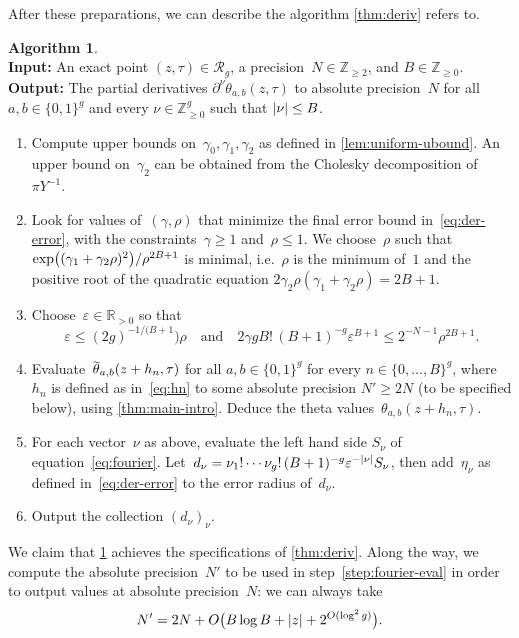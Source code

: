 \documentclass[12pt,oneside]{amsart}
\numberwithin{equation}{section}
\theoremstyle{definition}
\newtheorem{algorithm}[equation]{Algorithm}
\newcommand{\algoinput}[1]{~\\ \noindent\textbf{Input:} #1}
\newcommand{\algooutput}[1]{~\\ \noindent\textbf{Output:} #1}
\newcommand{\Z}{\mathbb{Z}}
\newcommand{\R}{\mathbb{R}}
\newcommand{\red}{\mathcal{R}}
\newcommand{\eps}{\varepsilon}
\DeclareMathOperator{\thetatilde}{\rlap{\raisebox{-0.1ex}{$\widetilde{\phantom{\,t}}$}}\theta}
\DeclarePairedDelimiter{\abs}{|}{|}
\DeclarePairedDelimiter{\paren}{(}{)}
\begin{document}
After these preparations, we can describe the algorithm \cref{thm:deriv} refers
to.

\begin{algorithm}
  \label{algo:deriv}
  \algoinput{An exact point $(z,\tau)\in \red_g$, a
    precision~$N\in \Z_{\geq 2}$, and $B\in \Z_{\geq 0}$.}  \algooutput{The
    partial derivatives $\partial^\nu\theta_{a,b}(z,\tau)$ to absolute
    precision~$N$ for all $a,b\in \{0,1\}^g$ and every $\nu\in \Z_{\geq 0}^g$
    such that $\abs{\nu}\leq B$.}
  \begin{enumerate}
  \item Compute upper bounds on~$\gamma_0,\gamma_1,\gamma_2$ as defined in
    \cref{lem:uniform-ubound}. An upper bound on~$\gamma_2$ can be obtained
    from the Cholesky decomposition of~$\pi Y^{-1}$.
  \item Look for values of~$(\gamma,\rho)$ that minimize the final error bound
    in~\eqref{eq:der-error}, with the constraints~$\gamma\geq 1$
    and~$\rho\leq 1$. We choose~$\rho$ such that
    $\exp\paren[\big]{(\gamma_1 + \gamma_2\rho)^2}/\rho^{2B+1}$ is minimal,
    i.e.~$\rho$ is the minimum of~$1$ and the positive root of the quadratic
    equation $2\gamma_2\rho(\gamma_1 + \gamma_2\rho) = 2B+1$.
  \item \label{step:eps} Choose~$\eps\in \R_{>0}$ so that
    \begin{displaymath}
      \eps\leq (2g)^{-1/(B+1})\rho\quad\text{and}\quad 2\gamma g B!\, (B+1)^{-g} \eps^{B+1}\leq 2^{-N-1} \rho^{2B+1}.
    \end{displaymath}
  \item \label{step:fourier-eval} Evaluate~$\thetatilde_{a,b}(z + h_n,\tau)$
    for all $a,b\in \{0,1\}^g$ for every $n\in \{0,\ldots,B\}^g$, where~$h_n$
    is defined as in~\eqref{eq:hn} to some absolute precision $N'\geq 2N$ (to
    be specified below), using \cref{thm:main-intro}. Deduce the theta
    values~$\theta_{a,b}(z + h_n,\tau)$.
  \item \label{step:fourier-sum} For each vector~$\nu$ as above, evaluate the
    left hand side $S_\nu$ of equation~\eqref{eq:fourier}.
    Let~$d_\nu = \nu_1!\cdots \nu_g!\, (B+1)^{-g} \eps^{-\abs{\nu}} S_\nu$, then add~$\eta_\nu$
    as defined in~\eqref{eq:der-error} to the error radius of~$d_\nu$.
  \item Output the collection $(d_\nu)_\nu$.
  \end{enumerate}
\end{algorithm}

We claim that \cref{algo:deriv} achieves the specifications of
\cref{thm:deriv}. Along the way, we compute the absolute precision~$N'$ to be
used in step~\eqref{step:fourier-eval} in order to output values at absolute
precision~$N$: we can always take
\begin{equation}
\label{eq:Nprime}
  N' = 2N + O\paren[\big]{B\log B + \abs{z} + 2^{O(\log^2 g)}}.
\end{equation}
\end{document}
